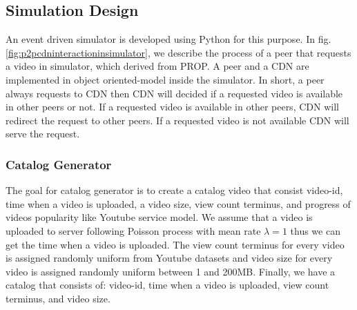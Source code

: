 \documentclass[10pt,final,journal,a4paper]{IEEEtran}
\begin{document}
\subsection{Simulation Design}\label{simulationdesign}
An event driven simulator is developed using Python for this purpose.
In fig.\ref{fig:p2pcdninteractioninsimulator}, we describe the process of a peer that requests a video in simulator, which derived from PROP.
A peer and a CDN are implemented in object oriented-model inside the simulator. 
In short, a peer always requests to CDN then CDN will decided if a requested video is available in other peers or not. 
If a requested video is available in other peers, CDN will redirect the request to other peers.
If a requested video is not available CDN will serve the request.


\subsubsection{Catalog Generator}\label{catalog}
The goal for catalog generator is to create a catalog video that consist video-id, time when a video is uploaded, a video size, view count terminus, and progress of videos popularity like Youtube service model. 
We assume that a video is uploaded to server following Poisson process with mean rate $\lambda=1$ thus we can get the time when a video is uploaded. 
The view count terminus for every video is assigned randomly uniform from Youtube datasets and video size for every video is assigned randomly uniform between 1 and 200MB. Finally, we have a catalog that consists of: video-id, time when a video is uploaded, view count terminus, and video size.
\end{document}
